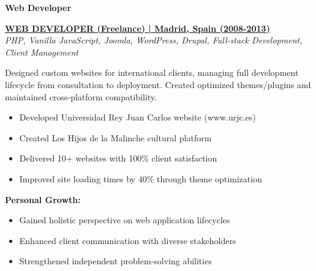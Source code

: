 \documentclass[a4paper,10pt]{article}
\begin{document}
    \pagebreak

    \noindent
    {%
    \begin{minipage}{\dimexpr\textwidth-2\fboxsep\relax}
        \vspace{0.2cm}

		{\large\bfseries\color{darkblue}\selectfont Web Developer}
		\vspace{0.3cm}

        \noindent\uline{\textbf{WEB DEVELOPER (Freelance) | Madrid, Spain (2008-2013)}} \\
		\vspace{0.1cm}
		{\small\textit{PHP, Vanilla JavaScript, Joomla, WordPress, Drupal, Full-stack Development, Client Management}}
		\vspace{0.2cm}

		Designed custom websites for international clients, managing full development lifecycle from consultation to deployment. Created optimized themes/plugins and maintained cross-platform compatibility.

		\vspace{0.2cm}
		\begin{itemize}[label=\textcolor{darkblue}{\textbullet}, leftmargin=*, nosep]
			\item Developed Universidad Rey Juan Carlos website (www.urjc.es)
			\item Created Los Hijos de la Malinche cultural platform
			\item Delivered 10+ websites with 100\% client satisfaction
			\item Improved site loading times by 40\% through theme optimization
		\end{itemize}

		\vspace{0.2cm}
		\textbf{Personal Growth:}
		\vspace{0.2cm}
		\begin{itemize}[label=\textcolor{darkblue}{\textbullet}, leftmargin=*, nosep]
			\item Gained holistic perspective on web application lifecycles
			\item Enhanced client communication with diverse stakeholders
			\item Strengthened independent problem-solving abilities
		\end{itemize}

        \vspace{0.2cm}



\end{minipage}}
\end{document}
